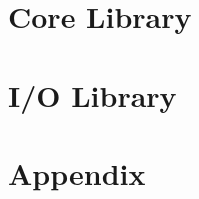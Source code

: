 \documentclass[%
  a4paper,%
  oneside,%
  12pt,%
]{article}
\begin{document}
\part{Core Library}
















\part{I/O Library}




\part{Appendix}





\end{document}
